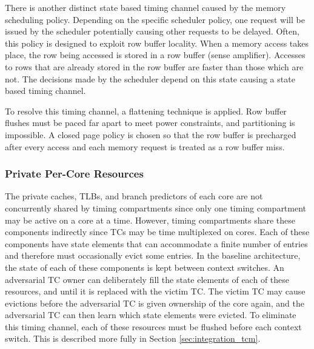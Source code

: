 There is another distinct state based timing channel caused by the memory 
scheduling policy. Depending on the specific scheduler policy, one request will 
be issued by the scheduler potentially causing other requests to be delayed.  
Often, this policy is designed to exploit row buffer locality. When a memory 
access takes place, the row being accessed is stored in a row buffer (sense 
amplifier). Accesses to rows that are already stored in the row buffer are 
faster than those which are not. The decisions made by the scheduler depend on 
this state causing a state based timing channel.

To resolve this timing channel, a flattening technique is applied. Row buffer 
flushes must be paced far apart to meet power constraints, and partitioning is 
impossible. A closed page policy is chosen so that the row buffer is precharged 
after every access and each memory request is treated as a row buffer miss.


\subsubsection{Private Per-Core Resources}

The private caches, TLBs, and branch predictors of each core are not 
concurrently shared by timing compartments since only one timing compartment 
may be active on a core at a time. However, timing compartments share these 
components indirectly since TCs may be time multiplexed on cores.  Each of 
these components have state elements that can accommodate a finite number of 
entries and therefore must occasionally evict some entries. In the baseline 
architecture, the state of each of these components is kept between context 
switches. An adversarial TC owner can deliberately fill the state elements of 
each of these resources, and until it is replaced with the victim TC. The 
victim TC may cause evictions before the adversarial TC is given ownership of 
the core again, and the adversarial TC can then learn which state elements were 
evicted. To eliminate this timing channel, each of these resources must be 
flushed before each context switch. This is described more fully in Section 
\ref{sec:integration_tcm}.

